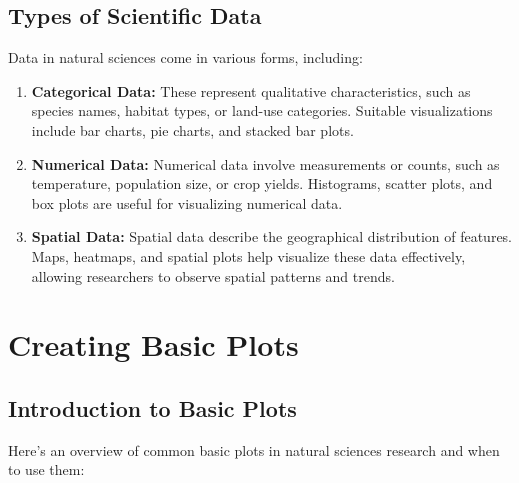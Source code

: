 \documentclass[
  letterpaper,
]{book}
\begin{document}
\subsection{Types of Scientific Data}\label{types-of-scientific-data}

Data in natural sciences come in various forms, including:

\begin{enumerate}
\def\labelenumi{\arabic{enumi}.}
\item
  \textbf{Categorical Data:} These represent qualitative
  characteristics, such as species names, habitat types, or land-use
  categories. Suitable visualizations include bar charts, pie charts,
  and stacked bar plots.
\item
  \textbf{Numerical Data:} Numerical data involve measurements or
  counts, such as temperature, population size, or crop yields.
  Histograms, scatter plots, and box plots are useful for visualizing
  numerical data.
\item
  \textbf{Spatial Data:} Spatial data describe the geographical
  distribution of features. Maps, heatmaps, and spatial plots help
  visualize these data effectively, allowing researchers to observe
  spatial patterns and trends.
\end{enumerate}

\section{Creating Basic Plots}\label{creating-basic-plots}

\subsection{Introduction to Basic
Plots}\label{introduction-to-basic-plots}

Here's an overview of common basic plots in natural sciences research
and when to use them:
\end{document}
